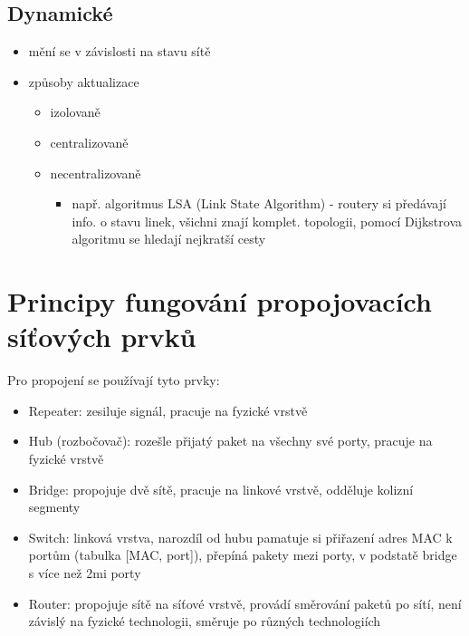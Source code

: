 \documentclass{szzclass}
\providecommand{\tightlist}{%
  \setlength{\itemsep}{0pt}\setlength{\parskip}{0pt}}
\begin{document}
\hypertarget{dynamickuxe9}{%
\subsection{Dynamické}\label{dynamickuxe9}}

\begin{itemize}
\tightlist
\item
  mění se v závislosti na stavu sítě
\item
  způsoby aktualizace

  \begin{itemize}
  \tightlist
  \item
    izolovaně
  \item
    centralizovaně
  \item
    necentralizovaně

    \begin{itemize}
    \tightlist
    \item
      např. algoritmus LSA (Link State Algorithm) - routery si předávají
      info. o stavu linek, všichni znají komplet. topologii, pomocí
      Dijkstrova algoritmu se hledají nejkratší cesty
    \end{itemize}
  \end{itemize}
\end{itemize}

\hypertarget{principy-fungovuxe1nuxed-propojovacuxedch-suxedux165ovuxfdch-prvkux16f}{%
\section{Principy fungování propojovacích síťových
prvků}\label{principy-fungovuxe1nuxed-propojovacuxedch-suxedux165ovuxfdch-prvkux16f}}
Pro propojení se používají tyto prvky:
\begin{itemize}
  \item Repeater: zesiluje signál, pracuje na fyzické vrstvě
  \item Hub (rozbočovač): rozešle přijatý paket na všechny své porty, pracuje na fyzické vrstvě
  \item Bridge: propojuje dvě sítě, pracuje na linkové vrstvě, odděluje kolizní segmenty
  \item Switch: linková vrstva, narozdíl od hubu pamatuje si přiřazení adres MAC k portům (tabulka [MAC, port]), přepíná pakety mezi porty, v podstatě bridge s více než 2mi porty
  \item Router: propojuje sítě na síťové vrstvě, provádí směrování paketů po sítí, není závislý na fyzické technologii, směruje po různých technologiích
\end{itemize}
\end{document}
